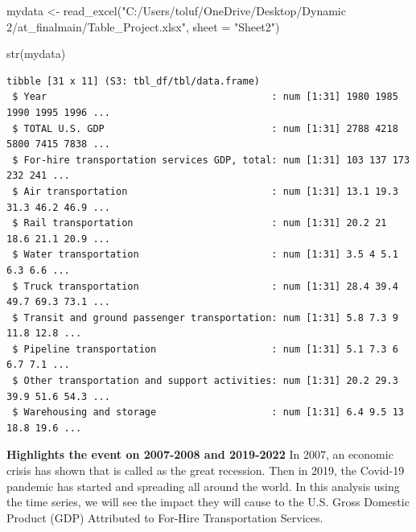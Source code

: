\documentclass[
  letterpaper,
  DIV=11,
  numbers=noendperiod]{scrreprt}
\newenvironment{Shaded}{\begin{snugshade}}{\end{snugshade}}
\newcommand{\AttributeTok}[1]{\textcolor[rgb]{0.40,0.45,0.13}{#1}}
\newcommand{\FunctionTok}[1]{\textcolor[rgb]{0.28,0.35,0.67}{#1}}
\newcommand{\NormalTok}[1]{\textcolor[rgb]{0.00,0.23,0.31}{#1}}
\newcommand{\OtherTok}[1]{\textcolor[rgb]{0.00,0.23,0.31}{#1}}
\newcommand{\StringTok}[1]{\textcolor[rgb]{0.13,0.47,0.30}{#1}}
\begin{document}
\begin{Shaded}
\begin{Highlighting}[]
\NormalTok{mydata }\OtherTok{\textless{}{-}} \FunctionTok{read\_excel}\NormalTok{(}\StringTok{"C:/Users/toluf/OneDrive/Desktop/Dynamic 2/at\_finalmain/Table\_Project.xlsx"}\NormalTok{, }\AttributeTok{sheet =} \StringTok{"Sheet2"}\NormalTok{)}

\FunctionTok{str}\NormalTok{(mydata)}
\end{Highlighting}
\end{Shaded}

\begin{verbatim}
tibble [31 x 11] (S3: tbl_df/tbl/data.frame)
 $ Year                                       : num [1:31] 1980 1985 1990 1995 1996 ...
 $ TOTAL U.S. GDP                             : num [1:31] 2788 4218 5800 7415 7838 ...
 $ For-hire transportation services GDP, total: num [1:31] 103 137 173 232 241 ...
 $ Air transportation                         : num [1:31] 13.1 19.3 31.3 46.2 46.9 ...
 $ Rail transportation                        : num [1:31] 20.2 21 18.6 21.1 20.9 ...
 $ Water transportation                       : num [1:31] 3.5 4 5.1 6.3 6.6 ...
 $ Truck transportation                       : num [1:31] 28.4 39.4 49.7 69.3 73.1 ...
 $ Transit and ground passenger transportation: num [1:31] 5.8 7.3 9 11.8 12.8 ...
 $ Pipeline transportation                    : num [1:31] 5.1 7.3 6 6.7 7.1 ...
 $ Other transportation and support activities: num [1:31] 20.2 29.3 39.9 51.6 54.3 ...
 $ Warehousing and storage                    : num [1:31] 6.4 9.5 13 18.8 19.6 ...
\end{verbatim}

\textbf{Highlights the event on 2007-2008 and 2019-2022} In 2007, an
economic crisis has shown that is called as the great recession. Then in
2019, the Covid-19 pandemic has started and spreading all around the
world. In this analysis using the time series, we will see the impact
they will cause to the U.S. Gross Domestic Product (GDP) Attributed to
For-Hire Transportation Services.
\end{document}
